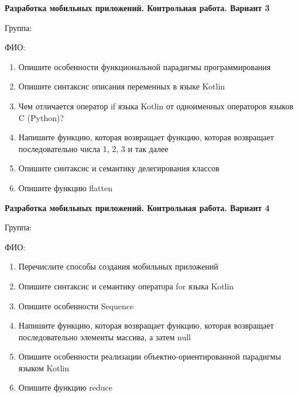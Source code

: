 \documentclass[12pt]{article}
\begin{document}
\newpage\begin{minipage}{\textwidth}
\textbf{Разработка мобильных приложений. Контрольная работа. Вариант 3}

Группа: \underline{\hspace{3cm}}

ФИО: \underline{\hspace{10cm}}

\begin{enumerate}
\item Опишите особенности функциональной парадигмы программирования
\item Опишите синтаксис описания переменных в языке Kotlin
\item Чем отличается оператор if языка Kotlin от одноименных операторов языков C (Python)?
\item Напишите функцию, которая возвращает функцию, которая возвращает последовательно числа 1, 2, 3 и так далее
\item Опишите синтаксис и семантику делегирования классов
\item Опишите функцию flatten

\end{enumerate}
\end{minipage}

\newpage\begin{minipage}{\textwidth}
\textbf{Разработка мобильных приложений. Контрольная работа. Вариант 4}

Группа: \underline{\hspace{3cm}}

ФИО: \underline{\hspace{10cm}}

\begin{enumerate}
\item Перечислите способы создания мобильных приложений
\item Опишите синтаксис и семантику оператора for языка Kotlin
\item Опишите особенности Sequence
\item Напишите функцию, которая возвращает функцию, которая возвращает последовательно элементы массива, а затем null
\item Опишите особенности реализации объектно-ориентированной парадигмы языком Kotlin
\item Опишите функцию reduce

\end{enumerate}
\end{minipage}
\end{document}
